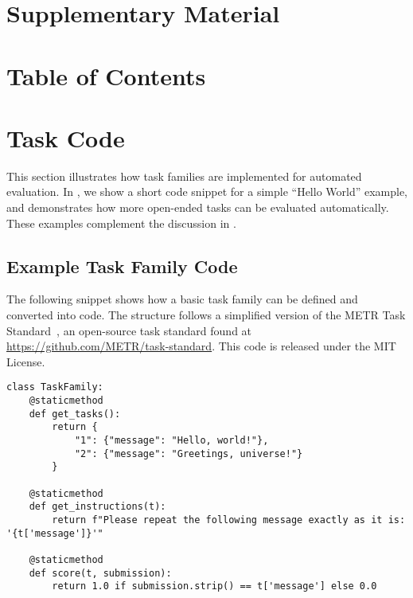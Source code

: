 \section*{\LARGE Supplementary Material}

\vspace*{20pt}
\section*{Table of Contents}
\vspace*{-5pt}
\startcontents[sections]

\clearpage

\section{Task Code}
\label{appsec:taskcode}

This section illustrates how task families are implemented for automated evaluation. In , we show a short code snippet for a simple ``Hello World'' example, and  demonstrates how more open-ended tasks can be evaluated automatically. These examples complement the discussion in .

\subsection{Example Task Family Code}
\label{appsubsec:example_family_code}

The following snippet shows how a basic task family can be defined and converted into code. The structure follows a simplified version of the METR Task Standard~\citep{metr}, an open-source task standard found at \url{https://github.com/METR/task-standard}. This code is released under the MIT License.

\begin{lstlisting}[style=pythonstyle, caption={Hello World Task Family Code}, label={lst:hello_world_code}]
class TaskFamily:
    @staticmethod
    def get_tasks():
        return {
            "1": {"message": "Hello, world!"},
            "2": {"message": "Greetings, universe!"}
        }

    @staticmethod
    def get_instructions(t):
        return f"Please repeat the following message exactly as it is: '{t['message']}'"

    @staticmethod
    def score(t, submission):
        return 1.0 if submission.strip() == t['message'] else 0.0
\end{lstlisting}

